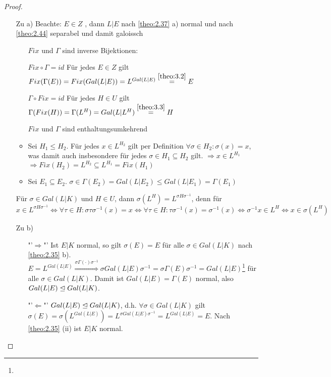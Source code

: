 \documentclass[../main.tex]{subfiles}
\begin{document}
\begin{proof} $ $
\begin{itemize}[align= left]
    \item[Zu a)]
    Beachte: $E\in Z$ , dann $L|E$ nach \cref{theo:2.37} a) normal und nach \cref{theo:2.44} separabel und damit galoissch
    
    \begin{itemize}[align=left]
        \item[]$Fix$ und $\Gamma$ sind inverse Bijektionen:
        \item[$Fix\circ \Gamma = id$] Für jedes $E\in Z$ gilt $Fix(\Gamma(E))=Fix(Gal(L|E)) = L^{Gal(L|E)}\overset{\ref{theo:3.2}}{=} E$
        \item[$\Gamma\circ Fix = id$] Für jedes $H\in U$ gilt $\Gamma(Fix(H)) = \Gamma(L^H) = Gal(L|L^H)\overset{\ref{theo:3.3}}{=}H$
    \end{itemize}
    
    \begin{itemize}[label=•,align=left]
        \item[$Fix$ und $\Gamma$ sind enthaltungsumkehrend] 
        \item Sei $H_1\leq H_2$.
        Für jedes $x\in L^{H_2}$  gilt per Definition $\forall\sigma\in H_2\colon \sigma(x)=x$, was damit auch insbesondere für jedes $\sigma\in H_1\subseteq H_2$ gilt. $\Rightarrow x\in L^{H_1}$\\
        $\Rightarrow Fix(H_2) = L^{H_2}\subseteq L^{H_1} = Fix(H_1)$
        \item 
        Sei $E_1\subseteq E_2$.
        $\sigma \in \Gamma(E_2) = Gal(L|E_2)\leq Gal(L|E_1)=\Gamma(E_1)$ 
    \end{itemize}

    
    \begin{remark*}
        Für $\sigma\in Gal(L|K)$ und $H\in U$, dann $\sigma(L^H) = L^{\sigma H \sigma^{-1}}$, denn für $x\in L^{\sigma H \sigma^{-1}} \Leftrightarrow \forall \tau \in H\colon \sigma \tau \sigma^{-1}(x)=x \Leftrightarrow \forall \tau \in H\colon \tau \sigma^{-1}(x) = \sigma^{-1}(x) \Leftrightarrow \sigma^{-1}x\in L^H \Leftrightarrow x\in \sigma(L^H)$
    \end{remark*}

    \item[Zu b)]$ $
    \begin{itemize}
        \item["'$\Rightarrow$"']
        Ist $E|K$ normal, so gilt $\sigma(E) = E$ für alle $\sigma \in Gal(L|K)$ nach \cref{theo:2.35} b).
        $E=L^{Gal(L|E)} \overset{\sigma\Gamma(\cdot)\sigma^{-1}}{\Longrightarrow} \sigma Gal(L|E) \sigma^{-1} = \sigma \Gamma(E) \sigma^{-1} = Gal(L|E)$\footnote{\TODO[Why does the last = hold true]} für alle $\sigma \in Gal(L|K)$.
        Damit ist $Gal(L|E)=\Gamma(E)$ normal, also $Gal(L|E)\trianglelefteq Gal(L|K)$.
        \item["'$\Leftarrow$"']
        $Gal(L|E) \trianglelefteq Gal(L|K)$, d.h. $\forall \sigma\in Gal(L|K)$ gilt $\sigma(E)=\sigma(L^{Gal(L|E)}) = L^{\sigma Gal(L|E) \sigma^{-1}} = L^{Gal(L|E)} = E$.
    Nach \cref{theo:2.35} (ii) ist $E|K$ normal.
    \end{itemize}


\end{itemize}
\end{proof}
\end{document}
